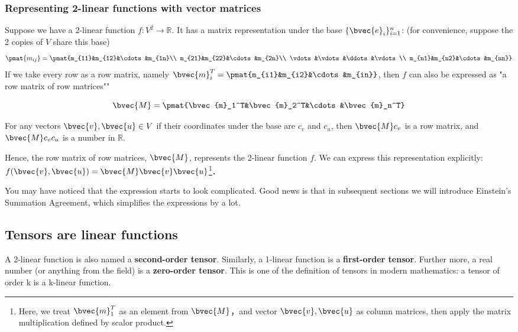 \subsubsection{Representing 2-linear functions with vector matrices}

Suppose we have a 2-linear function $f:V^2\rightarrow\mathbb{R}$. It has a matrix representation under the base $\{\bvec{e}_i\}_{i=1}^n$: (for convenience, suppose the 2 copies of $V$ share this base)
\begin{equation}
\pmat{m_{ij}}=\pmat{m_{11}&m_{12}&\cdots&m_{1n}\\ m_{21}&m_{22}&\cdots&m_{2n}\\ \vdots&\vdots&\ddots&\vdots\\ m_{n1}&m_{n2}&\cdots&m_{nn}}
\end{equation}
If we take every row as a row matrix, namely $\bvec{m}_i^T=\pmat{m_{i1}&m_{i2}&\cdots&m_{in}}$, then $f$ can also be expressed as "a row matrix of row matrices"" 

\begin{equation}
\bvec{M}=\pmat{\bvec{m}_1^T&\bvec{m}_2^T&\cdots&\bvec{m}_n^T}
\end{equation}

For any vectors $\bvec{v}, \bvec{u}\in V$ if their coordinates under the base are $c_v$ and $c_u$, then $\bvec{M}c_v$ is a row matrix, and $\bvec{M}c_vc_u$ is a number in $\mathbb{R}$. 

Hence, the row matrix of row matrices, $\bvec{M}$, represents the 2-linear function $f$. We can express this representation explicitly: $f(\bvec{v}, \bvec{u})=\bvec{M}\bvec{v}\bvec{u}$\footnote{Here, we treat $\bvec{m}_1^T$ as an element from $\bvec{M}$，and vector $\bvec{v}, \bvec{u}$ as column matrices, then apply the matrix multiplication defined by scalor product. }．

You may have noticed that the expression starts to look complicated. Good news is that in subsequent sections we will introduce Einstein's Summation Agreement, which simplifies the expressions by a lot. 

\subsection{Tensors are linear functions}

A 2-linear function is also named a \textbf{second-order tensor}. Similarly, a 1-linear function is a \textbf{first-order tensor}. Further more, a real number (or anything from the field) is a \textbf{zero-order tensor}. This is one of the definition of tensors in modern mathematics: a tensor of order k is a k-linear function. 

